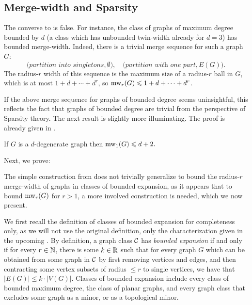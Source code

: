 \subsection{Merge-width and Sparsity}\label{sec:sparsity}
The converse to  is false. 
For instance,  the class 
of graphs of maximum degree bounded by $d$ (a class which has unbounded twin-width already for $d=3$) 
has bounded merge-width.
Indeed, there is a trivial merge sequence for such a graph $G$: 
 $$\bigl(\textit{partition into singletons},\emptyset\bigr),\quad \bigl(\textit{partition with one part},E(G)\bigr).$$
The radius-$r$ width of this sequence is 
the maximum size of a radius-$r$ ball in $G$,
which is at most $1+d+\cdots+d^r$, 
so 
$\operatorname{mw}_r(G)\leqslant 1+d+\cdots+d^r$.



If the above merge sequence for graphs of bounded degree seems uninsightful,
this reflects the fact that graphs of bounded degree are trivial from the perspective of Sparsity theory.
The next result is slightly more 
illuminating.
The proof is already given in .




\begin{theorem}\label{thm:deg}
  If $G$ is a $d$-degenerate graph then 
  $\operatorname{mw}_1(G)\leqslant d+2.$
\end{theorem}


Next, we prove:
\beintro*

The simple construction from  does not trivially generalize to bound the radius-$r$ merge-width 
of graphs in classes of bounded expansion,
as it appears that to bound $\operatorname{mw}_r(G)$ for $r>1$, a more involved construction 
is needed, which we now present.

\medskip

We first recall the definition of classes of bounded expansion for completeness only, as we will not use the original definition, only the characterization given in the upcoming .
By definition,  a graph class $\mathcal C$ has \emph{bounded expansion} if and only if for every $r\in\mathbb N$,
there is some $k\in\mathbb R$ such that for every graph $G$
which can be obtained from some graph in $\mathcal C$ by first removing vertices and edges, and then contracting 
some vertex subsets of radius ${\le r}$ to single vertices, 
we have that $|E(G)|\le k\cdot |V(G)|$.
Classes of bounded expansion include every class of bounded maximum degree,
the class of planar graphs, and every graph class that excludes some graph  as a  minor, or as a topological minor.


